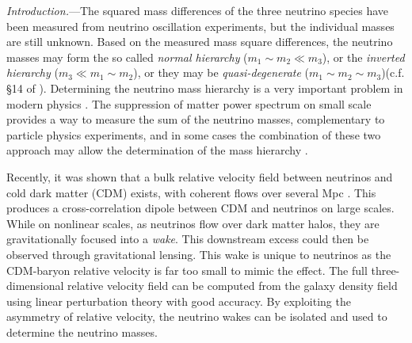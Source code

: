 \documentclass[aps,prl,twocolumn,showpacs,superscriptaddress,groupedaddress,nofootinbib]{revtex4}  %
\begin{document}
{\it Introduction.}---The squared mass differences of the three neutrino species 
have been measured from neutrino oscillation experiments, but 
the individual masses are still unknown. Based on the measured mass square 
differences, the neutrino masses may form the so called {\it normal 
hierarchy} ($m_1 \sim m_2 \ll m_3$), or the {\it inverted 
hierarchy} ($m_3 \ll m_1 \sim m_2$), or  they may be {\it quasi-degenerate} 
($m_1 \sim m_2 \sim m_3$)(c.f. \S 14 of \cite{2014ChPhC..38i0001O}). 
Determining the neutrino mass hierarchy is a very
important problem in modern physics \cite{2013arXiv1307.5487C}. 
The suppression of matter power spectrum on small scale  
provides a way to measure the sum of the neutrino 
masses\cite{Bond:1980,Hu:1997}, complementary 
to particle physics experiments, and in some cases 
the combination of these two approach may
allow the determination of the mass hierarchy \cite{Dodelson:2014}. 


Recently, it was shown that  a bulk relative velocity field between 
neutrinos and cold dark matter (CDM)
exists, with coherent flows over several Mpc \cite{Zhu:2013}.
This produces a cross-correlation dipole between CDM and neutrinos on large
scales. While on nonlinear scales,
as neutrinos flow over dark matter halos, they are gravitationally focused
into a {\it wake}.  This downstream excess could then be observed
through gravitational lensing. This wake is unique to
neutrinos as the CDM-baryon relative velocity is far too small to
mimic the effect.  The full three-dimensional relative velocity field can be
computed from the galaxy density field using linear perturbation 
theory with good accuracy.
By exploiting the asymmetry of relative velocity, the neutrino wakes
can be isolated and used to determine the neutrino masses.
\end{document}
